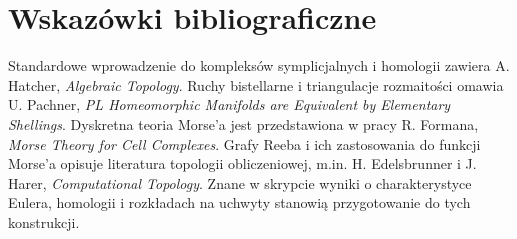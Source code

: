 \section*{Wskazówki bibliograficzne}
Standardowe wprowadzenie do kompleksów symplicjalnych i
homologii zawiera A. Hatcher, \emph{Algebraic Topology}.
Ruchy bistellarne i triangulacje rozmaitości omawia
U. Pachner, \emph{PL Homeomorphic Manifolds are Equivalent
by Elementary Shellings}.
Dyskretna teoria Morse'a jest przedstawiona w pracy
R. Formana, \emph{Morse Theory for Cell Complexes}.
Grafy Reeba i ich zastosowania do funkcji Morse'a
opisuje literatura topologii obliczeniowej, m.in.
H. Edelsbrunner i J. Harer, \emph{Computational Topology}.
Znane w skrypcie wyniki o charakterystyce Eulera,
homologii i rozkładach na uchwyty stanowią
przygotowanie do tych konstrukcji.



